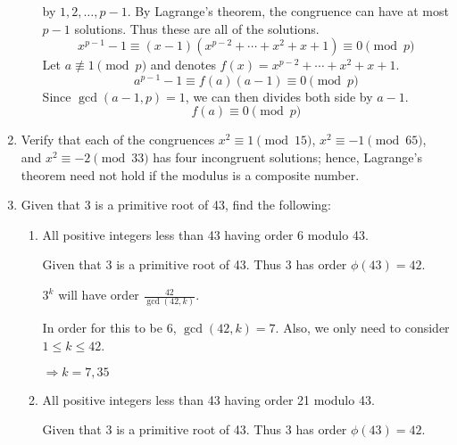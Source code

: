 \documentclass[12pt]{exam}
\theoremstyle{definition}
\begin{document}
\begin{enumerate}
\begin{enumerate}
\begin{answer}
                  by $1,2,\dots,p-1$. By Lagrange's theorem, the congruence can have at most $p-1$ solutions. Thus 
                  these are all of the solutions.
                  \[
                        x^{p-1} - 1 \equiv (x-1)(x^{p-2} + \cdots + x^2 + x + 1) \equiv 0 \pmod p
                  \]
                  Let $a \not\equiv 1 \pmod p$ and denotes $f(x) = x^{p-2} + \cdots + x^2 + x + 1$.
                  \[
                        a^{p-1} - 1 \equiv f(a)(a - 1) \equiv 0 \pmod p
                  \]
                  Since $\gcd(a - 1, p) = 1$, we can then divides both side by $a-1$.
                  \[
                        f(a) \equiv 0 \pmod p
                  \]
            \end{answer}
      \end{enumerate}
      \item Verify that each of the congruences $x^2 \equiv 1 \pmod {15}$, $x^2 \equiv -1 \pmod {65}$, 
      and $x^2 \equiv -2 \pmod {33}$ has four incongruent solutions; hence, Lagrange's theorem need 
      not hold if the modulus is a composite number.

      \begin{answer}
            
      \end{answer}


      \setcounter{enumi}{3}
      \item Given that 3 is a primitive root of 43, find the following:
      \begin{enumerate}
            \item All positive integers less than 43 having order 6 modulo 43.
            \begin{answer}
                  Given that 3 is a primitive root of 43. Thus 3 has order $\phi(43) = 42$.

                  $3^k$ will have order $\frac{42}{\gcd(42, k)}$.

                  In order for this to be 6, $\gcd(42, k) = 7$.
                  Also, we only need to consider $1 \leq k \leq 42$.

                  $\Rightarrow k = 7, 35$
            \end{answer}
            \item All positive integers less than 43 having order 21 modulo 43.
            \begin{answer}
                  Given that 3 is a primitive root of 43. Thus 3 has order $\phi(43) = 42$.
                  

\end{answer}
\end{enumerate}
\end{enumerate}
\end{document}
